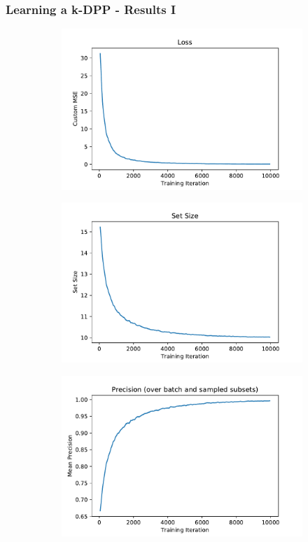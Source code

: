 \documentclass[aspectratio=43]{beamer}
\begin{document}
\begin{frame}
\frametitle{Learning a k-DPP - Results I}
\begin{figure}[ht] 
  \begin{subfigure}[b]{0.5\linewidth}
    \centering
    \includegraphics[width=0.9\linewidth]{plots/loss_kDPP.pdf} 
    \label{fig7:a} 
    \vspace{0.1ex}
  \end{subfigure}%
  \begin{subfigure}[b]{0.5\linewidth}
    \centering
    \includegraphics[width=0.9\linewidth]{plots/ssize_kDPP.pdf} 
    \label{fig7:b} 
    \vspace{0.1ex}
  \end{subfigure} 
  \begin{subfigure}[b]{0.5\linewidth}
    \centering
    \includegraphics[width=0.9\linewidth]{plots/prec_kDPP.pdf} 

\end{subfigure}
\end{figure}
\end{frame}
\end{document}
